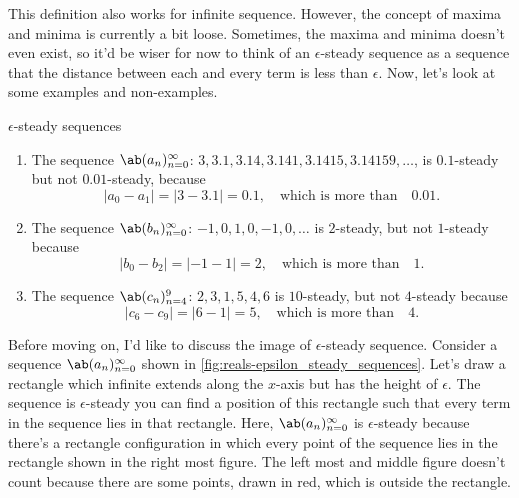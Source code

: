 This definition also works for infinite sequence. However, the concept of maxima and minima
is currently a bit loose. Sometimes, the maxima and minima doesn't even exist, so it'd
be wiser for now to think of an $\epsilon$-steady sequence as a sequence that the distance between
each and every term is less than $\epsilon$. Now, let's look at some examples and non-examples.

\begin{exmp}{$\epsilon$-steady sequences}{}
  \begin{enumerate}
    \item The sequence $\sequence{a_n}{n = 0}{\infty}$:
          $3, 3.1, 3.14, 3.141, 3.1415, 3.14159, \dots$, is $0.1$-steady but not
          $0.01$-steady, because
          \begin{equation*}
            |a_0 - a_1| = |3 - 3.1| = 0.1, \quad \textrm{which is more than} \quad 0.01.
          \end{equation*}
    \item The sequence $\sequence{b_n}{n = 0}{\infty}$: $-1, 0, 1, 0, -1, 0, \dots$ is
          $2$-steady, but not $1$-steady because
          \begin{equation*}
            |b_0 - b_2| = | - 1 - 1| = 2, \quad \textrm{which is more than} \quad 1.
          \end{equation*}
    \item The sequence $\sequence{c_n}{n = 4}{9}$: $2, 3, 1, 5, 4, 6$ is $10$-steady,
          but not $4$-steady because
          \begin{equation*}
            |c_6 - c_9| = |6 - 1| = 5, \quad \textrm{which is more than} \quad 4.
          \end{equation*}
  \end{enumerate}
\end{exmp}

Before moving on, I'd like to discuss the image of $\epsilon$-steady sequence. Consider
a sequence $\sequence{a_n}{n = 0}{\infty}$ shown in \cref{fig:reals-epsilon_steady_sequences}.
Let's draw a rectangle which infinite extends along the $x$-axis but has the height of
$\epsilon$. The sequence is $\epsilon$-steady \ifft you can find a position of this rectangle
such that every term in the sequence lies in that rectangle. Here, $\sequence{a_n}{n = 0}{\infty}$
is $\epsilon$-steady because there's a rectangle configuration in which every point of
the sequence lies in the rectangle shown in the right most figure. The left most and middle
figure doesn't count because there are some points, drawn in red, which is outside the rectangle.

